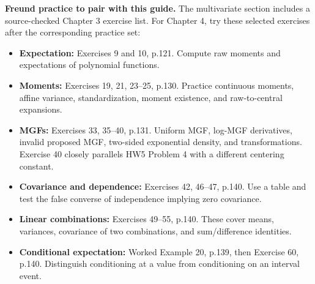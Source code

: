 \textbf{Freund practice to pair with this guide.} The multivariate section includes a source-checked Chapter 3 exercise list. For Chapter 4, try these selected exercises after the corresponding practice set:
\begin{itemize}
\item \textbf{Expectation:} Exercises 9 and 10, p.121. Compute raw moments and expectations of polynomial functions.
\item \textbf{Moments:} Exercises 19, 21, 23--25, p.130. Practice continuous moments, affine variance, standardization, moment existence, and raw-to-central expansions.
\item \textbf{MGFs:} Exercises 33, 35--40, p.131. Uniform MGF, log-MGF derivatives, invalid proposed MGF, two-sided exponential density, and transformations. Exercise 40 closely parallels HW5 Problem 4 with a different centering constant.
\item \textbf{Covariance and dependence:} Exercises 42, 46--47, p.140. Use a table and test the false converse of independence implying zero covariance.
\item \textbf{Linear combinations:} Exercises 49--55, p.140. These cover means, variances, covariance of two combinations, and sum/difference identities.
\item \textbf{Conditional expectation:} Worked Example 20, p.139, then Exercise 60, p.140. Distinguish conditioning at a value from conditioning on an interval event.
\end{itemize}

